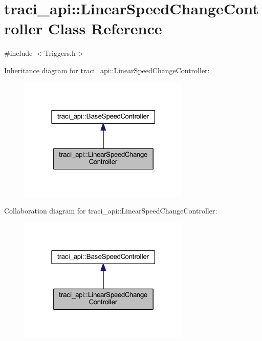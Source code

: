 \hypertarget{classtraci__api_1_1_linear_speed_change_controller}{}\section{traci\+\_\+api\+:\+:Linear\+Speed\+Change\+Controller Class Reference}
\label{classtraci__api_1_1_linear_speed_change_controller}


{\ttfamily \#include $<$Triggers.\+h$>$}



Inheritance diagram for traci\+\_\+api\+:\+:Linear\+Speed\+Change\+Controller\+:
\nopagebreak
\begin{figure}[H]
\begin{center}
\leavevmode
\includegraphics[width=231pt]{classtraci__api_1_1_linear_speed_change_controller__inherit__graph}
\end{center}
\end{figure}


Collaboration diagram for traci\+\_\+api\+:\+:Linear\+Speed\+Change\+Controller\+:
\nopagebreak
\begin{figure}[H]
\begin{center}
\leavevmode
\includegraphics[width=231pt]{classtraci__api_1_1_linear_speed_change_controller__coll__graph}
\end{center}
\end{figure}
